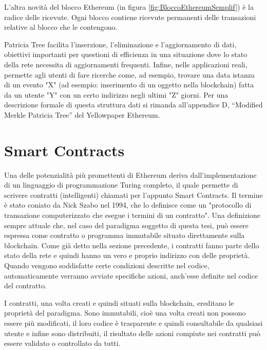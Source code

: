 L’altra novità del blocco Ethereum (in figura \ref{fig:BloccoEthereumSemplif}) è la radice delle ricevute. Ogni blocco contiene ricevute permanenti delle transazioni relative al blocco che le contengono.

Patricia Tree facilita l'inserzione, l'eliminazione e l'aggiornamento di dati, obiettivi importanti per questioni di efficienza in una situazione dove lo stato della rete necessita di aggiornamenti frequenti. Infine, nelle applicazioni reali, permette agli utenti di fare ricerche come, ad esempio, trovare una data istanza di un evento "X" (ad esempio: inserimento di un oggetto nella blockchain) fatta da un utente "Y" con un certo indirizzo negli ultimi "Z" giorni.
Per una descrizione formale di questa struttura dati si rimanda all’appendice D, “Modified Merkle Patricia Tree” del Yellowpaper Ethereum.

\section{Smart Contracts}

Una delle potenzialità più promettenti di Ethereum deriva dall’implementazione di un linguaggio di programmazione Turing completo, il quale permette di scrivere contratti (intelligenti) chiamati per l’appunto Smart Contracts. Il termine è stato coniato da Nick Szabo nel 1994, che lo definisce come un "protocollo di transazione computerizzato che esegue i termini di un contratto". Una definizione sempre attuale che, nel caso del paradigma soggetto di questa tesi, può essere espressa come contratto o programma immutabile situato direttamente sulla blockchain. Come già detto nella sezione precedente, i contratti fanno parte dello stato della rete e quindi hanno un vero e proprio indirizzo con delle proprietà. Quando vengono soddisfatte certe condizioni descritte nel codice, automaticamente verranno avviate specifiche azioni, anch'esse definite nel codice del contratto.

I contratti, una volta creati e quindi situati sulla blockchain, ereditano le proprietà del paradigma. Sono immutabili, cioè una volta creati non possono essere più modificati, il loro codice è trasparente e quindi consultabile da qualsiasi utente e infine sono distribuiti, il risultato delle azioni compiute nei contratti può essere validato o controllato da tutti.

